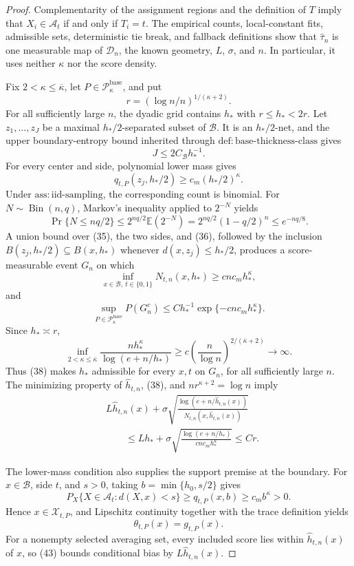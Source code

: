 \documentclass{article}
\begin{document}
\begin{proof}
Complementarity of the assignment regions and the definition of \(T\)
imply that \(X_i\in\mathcal A_t\) if and only if \(T_i=t\).  The empirical
counts, local-constant fits, admissible sets, deterministic tie break, and
fallback definitions show that \(\widehat\tau_n\) is one measurable map
of \(\mathcal D_n\), the known geometry, \(L\), \(\sigma\), and \(n\).
In particular, it uses neither \(\kappa\) nor the score density.

Fix \(2<\kappa\le\overline\kappa\), let
\(P\in\mathcal P_{\kappa}^{\mathrm{base}}\), and put
\[
 r=(\log n/n)^{1/(\kappa+2)}.
\]
For all sufficiently large \(n\), the dyadic grid contains \(h_*\) with
\(r\le h_*<2r\).  Let \(z_1,\ldots,z_J\) be a maximal
\(h_*/2\)-separated subset of \(\mathcal B\).  It is an
\(h_*/2\)-net, and the upper boundary-entropy bound inherited through
\(\mathrm{def:base\text{-}thickness\text{-}class}\) gives
\[
 J\le2C_{\mathcal B}h_*^{-1}.
 \tag{35}
\]
For every center and side, polynomial lower mass gives
\[
 q_{t,P}(z_j,h_*/2)\ge c_m(h_*/2)^\kappa.
 \tag{36}
\]
Under \(\mathrm{ass:iid\text{-}sampling}\), the corresponding count is
binomial.  For \(N\sim\operatorname{Bin}(n,q)\), Markov's inequality
applied to \(2^{-N}\) yields
\[
 \Pr\{N\le nq/2\}
 \le2^{nq/2}\mathbb E(2^{-N})
 =2^{nq/2}(1-q/2)^n
 \le e^{-nq/8}.
 \tag{37}
\]
A union bound over (35), the two sides, and (36), followed by the inclusion
\(B(z_j,h_*/2)\subseteq B(x,h_*)\) whenever
\(d(x,z_j)\le h_*/2\), produces a score-measurable event \(G_n\) on
which
\[
 \inf_{x\in\mathcal B,\ t\in\{0,1\}}N_{t,n}(x,h_*)
 \ge c n c_mh_*^\kappa,
 \tag{38}
\]
and
\[
 \sup_{P\in\mathcal P_{\kappa}^{\mathrm{base}}}P(G_n^c)
 \le Ch_*^{-1}\exp\{-c n c_mh_*^\kappa\}.
 \tag{39}
\]
Since \(h_*\asymp r\),
\[
 \inf_{2<\kappa\le\overline\kappa}
 \frac{nh_*^\kappa}{\log(e+n/h_*)}
 \ge c\left(\frac n{\log n}\right)^{2/(\overline\kappa+2)}
 \longrightarrow\infty.
 \tag{40}
\]
Thus (38) makes \(h_*\) admissible for every \(x,t\) on \(G_n\), for
all sufficiently large \(n\).  The minimizing property of
\(\widehat h_{t,n}\), (38), and \(nr^{\kappa+2}=\log n\) imply
\[
 \begin{aligned}
 &L\widehat h_{t,n}(x)
 +\sigma\sqrt{\frac{\log(e+n/\widehat h_{t,n}(x))}
 {N_{t,n}(x,\widehat h_{t,n}(x))}}\\
 &\qquad\le Lh_*+
 \sigma\sqrt{\frac{\log(e+n/h_*)}{c n c_mh_*^\kappa}}
 \le Cr.
 \end{aligned}
 \tag{41}
\]

The lower-mass condition also supplies the support premise at the
boundary.  For \(x\in\mathcal B\), side \(t\), and \(s>0\), taking
\(b=\min\{h_0,s/2\}\) gives
\[
 P_X\{X\in\mathcal A_t:d(X,x)<s\}
 \ge q_{t,P}(x,b)\ge c_mb^\kappa>0.
 \tag{42}
\]
Hence \(x\in\mathcal X_{t,P}\), and Lipschitz continuity together with
the trace definition yields
\[
 \theta_{t,P}(x)=g_{t,P}(x).
 \tag{43}
\]
For a nonempty selected averaging set, every included score lies within
\(\widehat h_{t,n}(x)\) of \(x\), so (43) bounds conditional bias by
\(L\widehat h_{t,n}(x)\).


\end{proof}
\end{document}
